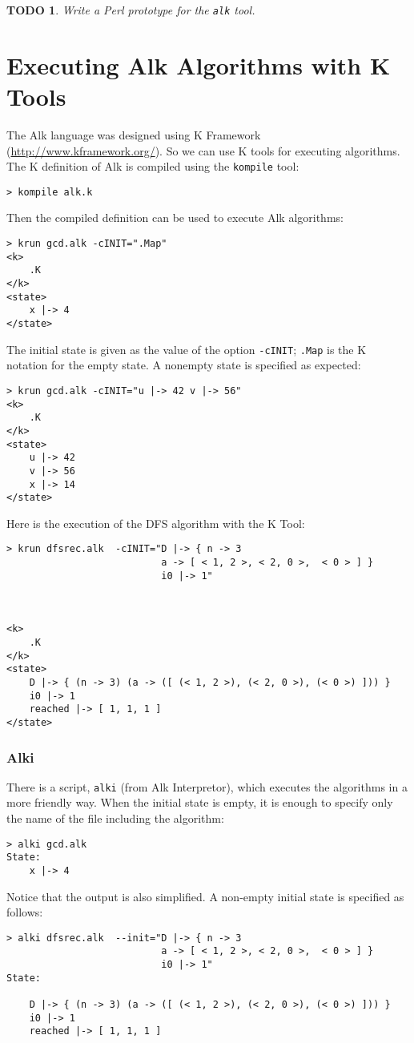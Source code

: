 \documentclass[a4paper]{report}
\newtheorem*{todo}{TODO}
\begin{document}
\begin{todo}
Write a Perl prototype for the {\tt alk} tool.
\end{todo}

\section{Executing Alk Algorithms with K Tools}

The Alk language was designed using K Framework (\url{http://www.kframework.org/}). So we can use K tools for executing algorithms. 
The K definition of Alk is compiled using the \texttt{kompile} tool:
\begin{verbatim}
> kompile alk.k
\end{verbatim}
Then the compiled definition can be used to execute Alk algorithms:
\begin{verbatim}
> krun gcd.alk -cINIT=".Map"
<k>
    .K
</k>
<state>
    x |-> 4
</state>
\end{verbatim}
The initial state is given as the value of the option \texttt{-cINIT}; \texttt{.Map} is the K notation for the empty state.
A nonempty state is specified as expected:
\begin{verbatim}
> krun gcd.alk -cINIT="u |-> 42 v |-> 56"
<k>
    .K
</k>
<state>
    u |-> 42
    v |-> 56
    x |-> 14
</state>
\end{verbatim}

Here is the execution of the DFS algorithm with the K Tool:
\begin{verbatim}
> krun dfsrec.alk  -cINIT="D |-> { n -> 3
                           a -> [ < 1, 2 >, < 2, 0 >,  < 0 > ] }
                           i0 |-> 1"



<k>
    .K
</k>
<state>
    D |-> { (n -> 3) (a -> ([ (< 1, 2 >), (< 2, 0 >), (< 0 >) ])) }
    i0 |-> 1
    reached |-> [ 1, 1, 1 ]
</state>
\end{verbatim}

\subsubsection{Alki}

There is a script, \texttt{alki} (from Alk Interpretor), which executes the algorithms in a more friendly way. When the initial state is empty, it is enough to specify only the name of the file including the algorithm:
\begin{verbatim}
> alki gcd.alk 
State:
    x |-> 4
\end{verbatim}
Notice that the output is also simplified. A non-empty initial state is specified as follows:
\begin{verbatim}
> alki dfsrec.alk  --init="D |-> { n -> 3
                           a -> [ < 1, 2 >, < 2, 0 >,  < 0 > ] }
                           i0 |-> 1"
State:

    D |-> { (n -> 3) (a -> ([ (< 1, 2 >), (< 2, 0 >), (< 0 >) ])) }
    i0 |-> 1
    reached |-> [ 1, 1, 1 ]
\end{verbatim}
\end{document}
